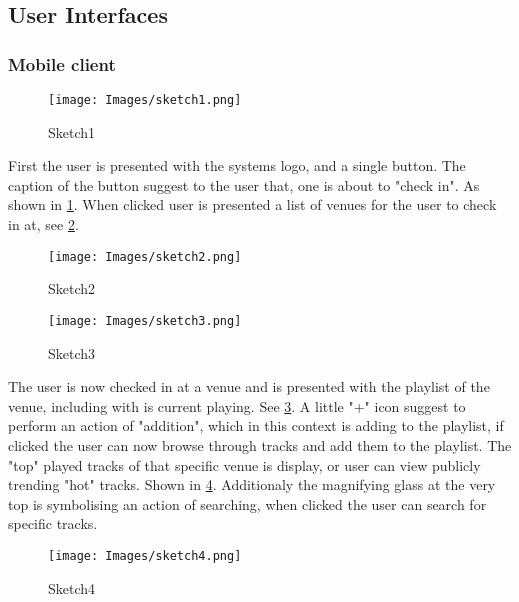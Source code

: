 \subsection{User Interfaces}

\subsubsection{Mobile client}

\begin{figure}
  \centering
  \texttt{[image: Images/sketch1.png]}
  \caption{Sketch1}
  \label{fig:sketch1}
\end{figure}

First the user is presented with the systems logo, and a single button. The caption of the button suggest to the user that, one is about to "check in". As shown in \cref{fig:sketch1}. When clicked user is presented a list of venues for the user to check in at, see \cref{fig:sketch2}.

\begin{figure}
  \centering
  \texttt{[image: Images/sketch2.png]}
  \caption{Sketch2}
  \label{fig:sketch2}
\end{figure}

\begin{figure}
  \centering
  \texttt{[image: Images/sketch3.png]}
  \caption{Sketch3}
  \label{fig:sketch3}
\end{figure}

The user is now checked in at a venue and is presented with the playlist of the venue, including with is current playing. See \cref{fig:sketch3}. A little "+" icon suggest to perform an action of "addition", which in this context is adding to the playlist, if clicked the user can now browse through tracks and add them to the playlist. The "top" played tracks of that specific venue is display, or user can view publicly trending "hot" tracks. Shown in \cref{fig:sketch4}. Additionaly the magnifying glass at the very top is symbolising an action of searching, when clicked the user can search for specific tracks.

\begin{figure}
  \centering
  \texttt{[image: Images/sketch4.png]}
  \caption{Sketch4}
  \label{fig:sketch4}
\end{figure}
